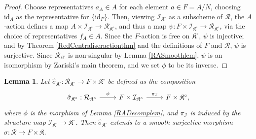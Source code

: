 \documentclass{amsart}
\newtheorem{lemma}[theorem]{Lemma}
\theoremstyle{remark}
\numberwithin{theorem}{section}
\numberwithin{equation}{section}
\begin{document}
\begin{proof}
 Choose representatives $a_A \in A$ for each element $a \in F = A/N$, choosing $\text{id}_A$ as the representative for $\{\text{id}_F\}$. Then, viewing $\mathcal I_{\mathfrak{K}^\circ}$ as a subscheme of $\mathcal R$, the $A$-action defines a map $A \times \mathcal I_{\mathfrak{K}^\circ} \rightarrow \mathcal R_{\mathfrak{K^\circ}}$, and thus a map $\psi:F \times \mathcal I_{\mathfrak{K}^\circ} \rightarrow \mathcal R_{\mathfrak{K}^\circ}$, via the choice of representatives $f_A \in A$. Since the $F$-action is free on $\mathfrak{K^\circ}$, $\psi$ is injective; and by Theorem \ref{RedCentraliseractionthm} and the definitions of $F$ and $\mathcal R$, $\psi$ is surjective. Since $\mathcal R_{\mathfrak{K}^\circ}$ is non-singular by Lemma \ref{RASmoothlem}, $\psi$ is an isomorphism by Zariski's main theorem, and we set $\phi$ to be its inverse.
 \end{proof}

\begin{lemma}\label{RAQuasiSteinlem}
    Let $\hat{\sigma}_{\mathfrak{K}^\circ}:\mathcal R_{\mathfrak{K}^{\circ}} \rightarrow F \times \mathfrak{K}^{\circ}$ be defined as the composition
    \begin{equation}\label{RAQuasiStein1eqn}
\begin{tikzcd}
\hat{\sigma}_{\mathfrak{K}^\circ}:\mathcal R_{\mathfrak{K}^\circ} \arrow[r, "\phi"] & F \times \mathcal I_{\mathfrak{K}^\circ} \arrow[r, "\pi_\mathcal I"] & F \times \mathfrak{K}^{\circ},
\end{tikzcd}
    \end{equation}
    where $\phi$ is the morphism of Lemma \ref{RADecomplem}, and $\pi_{\mathcal I}$ is induced by the structure map $\mathcal I_{\mathfrak{K}^\circ}\rightarrow \mathfrak{K}^\circ$. Then $\hat{\sigma}_{\mathfrak{K}^\circ}$ extends to a smooth surjective morphism $\hat{\sigma}:\mathcal R \rightarrow F \times \mathfrak{K}$.
\end{lemma}
\end{document}
